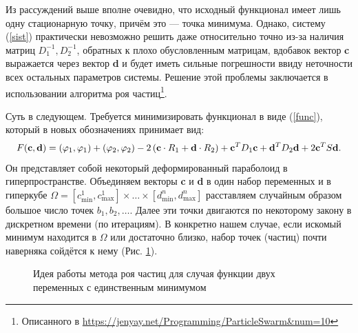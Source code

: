 \documentclass[a4paper]{article}
\begin{document}
Из рассуждений выше вполне очевидно, что исходный функционал имеет лишь одну стационарную точку, причём это --- точка минимума.
Однако, систему (\ref{sist}) практически невозможно решить даже относительно точно из-за наличия матриц $D_1^{-1}, D_2^{-1}$, обратных к плохо обусловленным матрицам, вдобавок
вектор {\bf c} выражается через вектор {\bf d} и будет иметь сильные погрешности ввиду неточности всех остальных параметров системы.
Решение этой проблемы заключается в использовании алгоритма роя частиц\footnote{Описанного в \url{https://jenyay.net/Programming/ParticleSwarm&num=10}}.

Суть в следующем. Требуется минимизировать функционал в виде (\ref{func}), который в новых обозначениях принимает вид:
\begin{equation}
  F({\bf c},{\bf d})=(\varphi_1,\varphi_1)+(\varphi_2,\varphi_2)-2\left({\bf c}\cdot R_1+{\bf d}\cdot R_2\right)+
  {\bf c}^T D_1 {\bf c}+{\bf d}^T D_2 {\bf d}+2{\bf c}^T S {\bf d}.
\end{equation}
Он представляет собой некоторый деформированный параболоид в гиперпространстве.
Объединяем векторы {\bf c} и {\bf d} в один набор переменных и в гиперкубе $\Omega=[c^1_{\min},c^1_{\max}] \times \dots \times [d^n_{\min},d^n_{\max}]$
расставляем случайным образом большое число точек $b_1, b_2, \dots$.
Далее эти точки двигаются по некоторому закону в дискретном времени (по итерациям).
В конкретно нашем случае, если искомый минимум находится в $\Omega$ или достаточно близко, набор точек (частиц) почти наверняка сойдётся к нему (Рис. \ref{parab}).

\begin{figure}[h!]
  \caption{Идея работы метода роя частиц для случая функции двух переменных с единственным минимумом}
  \label{parab}
\end{figure}
\end{document}

